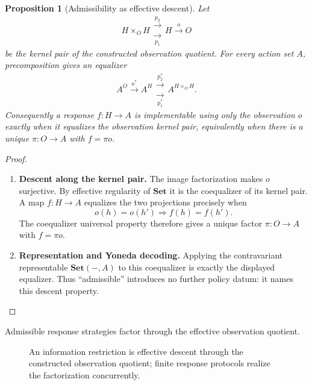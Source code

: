 \documentclass[11pt,a4paper]{article}
\numberwithin{equation}{section}
\newtheorem{proposition}[theorem]{Proposition}
\theoremstyle{definition}
\theoremstyle{remark}
\theoremstyle{plain}
\begin{document}
\begin{proposition}[Admissibility as effective descent]
\label{prop:egt-observation}
Let
\[
 H\times_OH
 \mathrel{\substack{\xrightarrow{p_2}\\[-2pt]\xrightarrow[p_1]{}}}H
 \xrightarrow{o}O
\]
be the kernel pair of the constructed observation quotient. For every action
set $A$, precomposition gives an equalizer
\[
 A^O\xrightarrow{o^*}A^H
 \mathrel{\substack{\xrightarrow{p_2^*}\\[-2pt]
                     \xrightarrow[p_1^*]{}}}A^{H\times_OH}.
\]
Consequently a response $f:H\to A$ is implementable using only the observation
$o$ exactly when it equalizes the observation kernel pair, equivalently when
there is a unique $\pi:O\to A$ with $f=\pi o$.
\end{proposition}
\begin{proof}
\leavevmode
\begin{enumerate}[label=\textup{(\arabic*)},leftmargin=*,itemsep=4pt,topsep=3pt]
  \item \textbf{Descent along the kernel pair.} The image factorization makes $o$ surjective. By effective regularity of
$\mathbf{Set}$ it is the coequalizer of its kernel pair. A map
$f:H\to A$ equalizes the two projections precisely when
\[
 o(h)=o(h')\Longrightarrow f(h)=f(h').
\]
The coequalizer universal property therefore gives a unique factor
$\pi:O\to A$ with $f=\pi o$.
  \item \textbf{Representation and Yoneda decoding.} Applying the contravariant representable
$\mathbf{Set}(-,A)$ to this coequalizer is exactly the displayed equalizer. Thus ``admissible'' introduces no further policy datum: it names this descent
property.
\end{enumerate}
\end{proof}

\noindent Admissible response strategies factor through the effective observation quotient.
\begin{center}
\end{center}

\begin{figure}[htbp]
\centering
{}
\qquad
{}
\caption{An information restriction is effective descent through the
constructed observation quotient; finite response protocols realize the
factorization concurrently.}
\end{figure}
\end{document}
